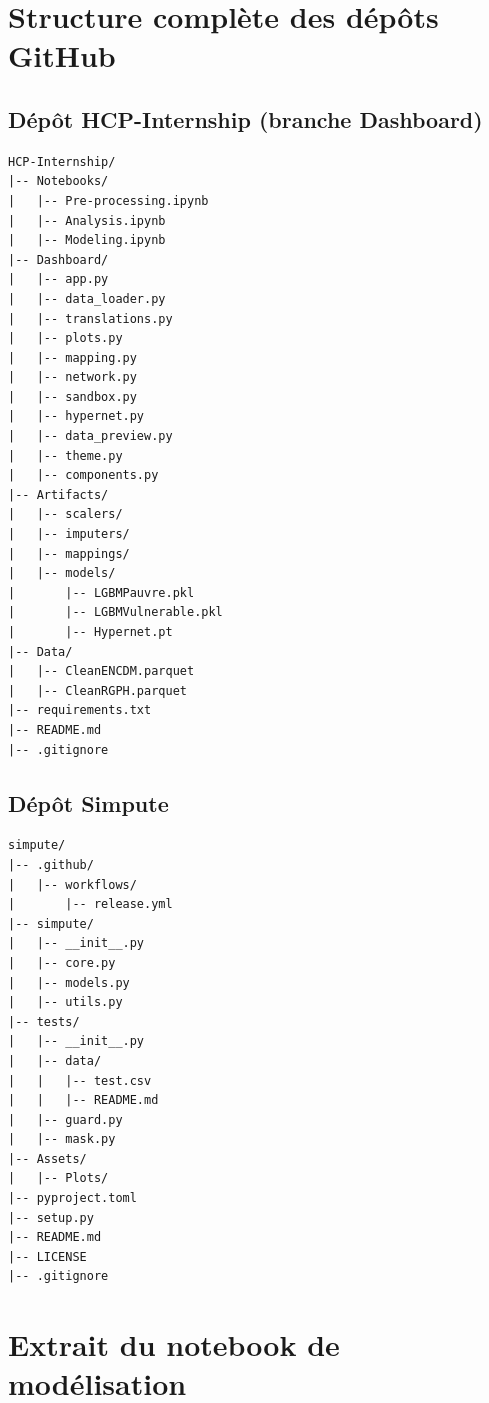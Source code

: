 \documentclass[12pt,a4paper]{report}
\begin{document}
\appendix

\chapter{Structure complète des dépôts GitHub}

\section{Dépôt HCP-Internship (branche Dashboard)}

\begin{lstlisting}[style=treenostyle, caption={Arborescence complete du depot HCP-Internship}]
HCP-Internship/
|-- Notebooks/
|   |-- Pre-processing.ipynb
|   |-- Analysis.ipynb
|   |-- Modeling.ipynb
|-- Dashboard/
|   |-- app.py
|   |-- data_loader.py
|   |-- translations.py
|   |-- plots.py
|   |-- mapping.py
|   |-- network.py
|   |-- sandbox.py
|   |-- hypernet.py
|   |-- data_preview.py
|   |-- theme.py
|   |-- components.py
|-- Artifacts/
|   |-- scalers/
|   |-- imputers/
|   |-- mappings/
|   |-- models/
|       |-- LGBMPauvre.pkl
|       |-- LGBMVulnerable.pkl
|       |-- Hypernet.pt
|-- Data/
|   |-- CleanENCDM.parquet
|   |-- CleanRGPH.parquet
|-- requirements.txt
|-- README.md
|-- .gitignore
\end{lstlisting}

\section{Dépôt Simpute}

\begin{lstlisting}[style=treenostyle, caption={Arborescence complete du depot Simpute}]
simpute/
|-- .github/
|   |-- workflows/
|       |-- release.yml
|-- simpute/
|   |-- __init__.py
|   |-- core.py
|   |-- models.py
|   |-- utils.py
|-- tests/
|   |-- __init__.py
|   |-- data/
|   |   |-- test.csv
|   |   |-- README.md
|   |-- guard.py
|   |-- mask.py
|-- Assets/
|   |-- Plots/
|-- pyproject.toml
|-- setup.py
|-- README.md
|-- LICENSE
|-- .gitignore
\end{lstlisting}

\chapter{Extrait du notebook de modélisation}
\end{document}
